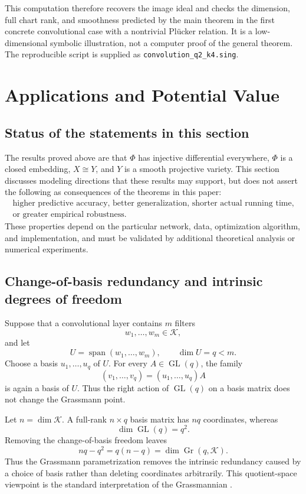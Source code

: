 \documentclass{siamonline250211}
\newcommand{\Gr}{\operatorname{Gr}}
\newcommand{\Span}{\operatorname{span}}
\newcommand{\GL}{\operatorname{GL}}
\newcommand{\cK}{\mathcal K}
\begin{document}
This computation therefore recovers the image ideal and checks the dimension,
full chart rank, and smoothness predicted by the main theorem in the first
concrete convolutional case with a nontrivial Pl\"ucker relation. It is a
low-dimensional symbolic illustration, not a computer proof of the general
theorem. The reproducible script is supplied as
\texttt{convolution\_q2\_k4.sing}.

\section{Applications and Potential Value}

\subsection{Status of the statements in this section}

The results proved above are that $\Phi$ has injective differential everywhere,
$\Phi$ is a closed embedding, $X\cong Y$, and $Y$ is a smooth projective
variety. This section discusses modeling directions that these results may
support, but does not assert the following as consequences of the theorems in
this paper:
\[
  \begin{gathered}
  \text{higher predictive accuracy, better generalization, shorter actual
  running time,}\\
  \text{or greater empirical robustness}.
  \end{gathered}
\]
These properties depend on the particular network, data, optimization algorithm,
and implementation, and must be validated by additional theoretical analysis or
numerical experiments.

\subsection{Change-of-basis redundancy and intrinsic degrees of freedom}

Suppose that a convolutional layer contains $m$ filters
\[
  w_1,\ldots,w_m\in\cK,
\]
and let
\[
  U=\Span(w_1,\ldots,w_m),
  \qquad \dim U=q<m.
\]
Choose a basis $u_1,\ldots,u_q$ of $U$. For every $A\in\GL(q)$, the family
\[
  (v_1,\ldots,v_q)=(u_1,\ldots,u_q)A
\]
is again a basis of $U$. Thus the right action of $\GL(q)$ on a basis matrix does
not change the Grassmann point.

Let $n=\dim\cK$. A full-rank $n\times q$ basis matrix has $nq$ coordinates,
whereas
\[
  \dim\GL(q)=q^2.
\]
Removing the change-of-basis freedom leaves
\[
  nq-q^2=q(n-q)=\dim\Gr(q,\cK).
\]
Thus the Grassmann parametrization removes the intrinsic redundancy caused by a
choice of basis rather than deleting coordinates arbitrarily. This quotient-space
viewpoint is the standard interpretation of the Grassmannian
\cite[Lecture~6, pp.~63--66]{Har92}.
\end{document}
